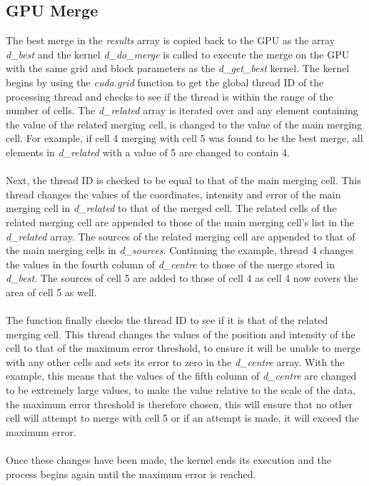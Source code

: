 \subsection{GPU Merge}
The best merge in the \textit{results} array is copied back to the GPU as the array \textit{d\_best} and the kernel \textit{d\_do\_merge} is called to execute the merge on the GPU with the same grid and block parameters as the \textit{d\_get\_best} kernel. The kernel begins by using the \textit{cuda.grid} function to get the global thread ID of the processing thread and checks to see if the thread is within the range of the number of cells. The \textit{d\_related} array is iterated over and any element containing the value of the related merging cell, is changed to the value of the main merging cell. For example, if cell 4 merging with cell 5 was found to be the best merge, all elements in \textit{d\_related} with a value of 5 are changed to contain 4.
\\
\\
Next, the thread ID is checked to be equal to that of the main merging cell. This thread changes the values of the coordinates, intensity and error of the main merging cell in \textit{d\_related} to that of the merged cell. The related cells of the related merging cell are appended to those of the main merging cell's list in the \textit{d\_related} array. The sources of the related merging cell are appended to that of the main merging cells in \textit{d\_sources}. Continuing the example, thread 4 changes the values in the fourth column of \textit{d\_centre} to those of the merge stored in \textit{d\_best}. The sources of cell 5 are added to those of cell 4 as cell 4 now covers the area of cell 5 as well.
\\
\\
The function finally checks the thread ID to see if it is that of the related merging cell. This thread changes the values of the position and intensity of the cell to that of the maximum error threshold, to ensure it will be unable to merge with any other cells and sets its error to zero in the \textit{d\_centre} array. With the example, this means that the values of the fifth column of \textit{d\_centre} are changed to be extremely large values, to make the value relative to the scale of the data, the maximum error threshold is therefore chosen, this will ensure that no other cell will attempt to merge with cell 5 or if an attempt is made, it will exceed the maximum error.
\\
\\
Once these changes have been made, the kernel ends its execution and the process begins again until the maximum error is reached.